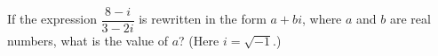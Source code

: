 If the expression $\dfrac{8-i}{3-2i}$ is rewritten in the form $a+bi$, where $a$ and $b$ are real numbers, what is the value of $a$? (Here $i=\sqrt{-1}$.)
